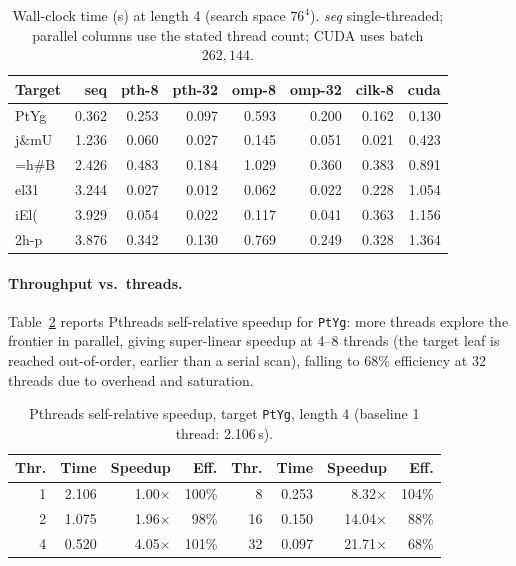 \documentclass[11pt,a4paper]{article}
\begin{document}
\begin{table}[H]
\centering
\caption{Wall-clock time (s) at length 4 (search space $76^{4}$). \textit{seq} single-threaded;
parallel columns use the stated thread count; CUDA uses batch $262{,}144$.}
\label{tab:len4}
\small
\begin{tabular}{@{}lrrrrrrr@{}}
\toprule
\textbf{Target} & \textbf{seq} & \textbf{pth-8} & \textbf{pth-32} & \textbf{omp-8} & \textbf{omp-32} & \textbf{cilk-8} & \textbf{cuda} \\
\midrule
PtYg  & 0.362 & 0.253 & 0.097 & 0.593 & 0.200 & 0.162 & 0.130 \\
j\&mU & 1.236 & 0.060 & 0.027 & 0.145 & 0.051 & 0.021 & 0.423 \\
=h\#B & 2.426 & 0.483 & 0.184 & 1.029 & 0.360 & 0.383 & 0.891 \\
el31  & 3.244 & 0.027 & 0.012 & 0.062 & 0.022 & 0.228 & 1.054 \\
iEl(  & 3.929 & 0.054 & 0.022 & 0.117 & 0.041 & 0.363 & 1.156 \\
2h-p  & 3.876 & 0.342 & 0.130 & 0.769 & 0.249 & 0.328 & 1.364 \\
\bottomrule
\end{tabular}
\end{table}

\vspace{-0.3cm}
\paragraph{Throughput vs.\ threads.} Table~\ref{tab:speedup} reports Pthreads self-relative speedup
for \texttt{PtYg}: more threads explore the frontier in parallel, giving super-linear speedup at
4--8 threads (the target leaf is reached out-of-order, earlier than a serial scan), falling to
$68\%$ efficiency at 32 threads due to overhead and saturation.

\begin{table}[H]
\centering
\caption{Pthreads self-relative speedup, target \texttt{PtYg}, length 4 (baseline 1 thread: 2.106\,s).}
\label{tab:speedup}
\small
\begin{tabular}{@{}rrrr|rrrr@{}}
\toprule
\textbf{Thr.} & \textbf{Time} & \textbf{Speedup} & \textbf{Eff.} &
\textbf{Thr.} & \textbf{Time} & \textbf{Speedup} & \textbf{Eff.} \\
\midrule
1 & 2.106 & 1.00$\times$ & 100\% & 8  & 0.253 & 8.32$\times$  & 104\% \\
2 & 1.075 & 1.96$\times$ & 98\%  & 16 & 0.150 & 14.04$\times$ & 88\%  \\
4 & 0.520 & 4.05$\times$ & 101\% & 32 & 0.097 & 21.71$\times$ & 68\%  \\
\bottomrule
\end{tabular}
\end{table}
\end{document}
